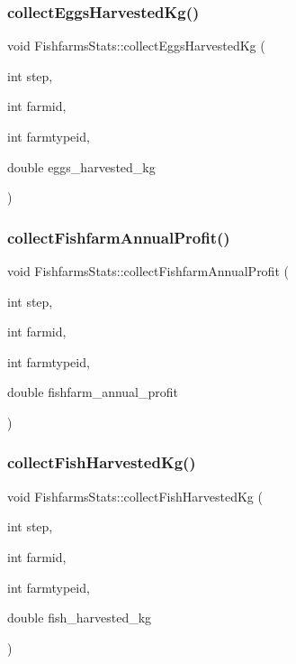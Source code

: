 \mbox{\label{class_fishfarms_stats_af2ee722bc230c1e802719fcd6f2d1210}} 
\subsubsection{\texorpdfstring{collectEggsHarvestedKg()}{collectEggsHarvestedKg()}}
{\footnotesize\ttfamily void Fishfarms\+Stats\+::collect\+Eggs\+Harvested\+Kg (\begin{DoxyParamCaption}\item[{int}]{step,  }\item[{int}]{farmid,  }\item[{int}]{farmtypeid,  }\item[{double}]{eggs\+\_\+harvested\+\_\+kg }\end{DoxyParamCaption})}

\mbox{\label{class_fishfarms_stats_a606f38d9ccf4579878977ff2fd32a93a}} 
\subsubsection{\texorpdfstring{collectFishfarmAnnualProfit()}{collectFishfarmAnnualProfit()}}
{\footnotesize\ttfamily void Fishfarms\+Stats\+::collect\+Fishfarm\+Annual\+Profit (\begin{DoxyParamCaption}\item[{int}]{step,  }\item[{int}]{farmid,  }\item[{int}]{farmtypeid,  }\item[{double}]{fishfarm\+\_\+annual\+\_\+profit }\end{DoxyParamCaption})}

\mbox{\label{class_fishfarms_stats_aa82750f6596838b63d9ef054cbf6c985}} 
\subsubsection{\texorpdfstring{collectFishHarvestedKg()}{collectFishHarvestedKg()}}
{\footnotesize\ttfamily void Fishfarms\+Stats\+::collect\+Fish\+Harvested\+Kg (\begin{DoxyParamCaption}\item[{int}]{step,  }\item[{int}]{farmid,  }\item[{int}]{farmtypeid,  }\item[{double}]{fish\+\_\+harvested\+\_\+kg }\end{DoxyParamCaption})}

